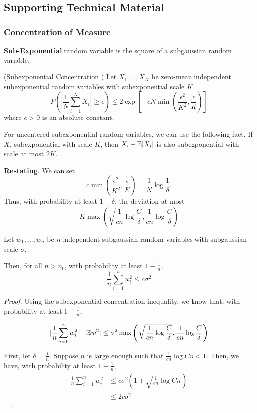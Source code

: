  
 
 
 
 
 
 \subsection{Supporting Technical Material}
 
 \subsubsection{Concentration of Measure}

\textbf{Sub-Exponential} random variable is the square of a subgaussian random variable\cite{vershynin2010introduction}.

\begin{proposition} (Subexponential Concentration \cite{vershynin2010introduction})
Let $X_1,...,X_N$ be zero-mean independent subexponential random variables with subexponential scale $K$. 
\[
P( | \frac{1}{N} \sum_{i=1}^N X_i | \geq \epsilon) \leq
	2 \exp \left[ -c N \min\left( \frac{\epsilon^2}{K^2}, \frac{\epsilon}{K} \right) \right]
\]
where $c > 0$ is an absolute constant.
\end{proposition}

For uncentered subexponential random variables, we can use the following fact. If $X_i$ subexponential with scale $K$, then $X_i - {\mathbb E}[X_i]$ is also subexponential with scale at most $2K$.

\textbf{Restating}. We can set
\[
c \min\left( \frac{\epsilon^2}{K^2}, \frac{\epsilon}{K} \right) = \frac{1}{N} \log \frac{1}{\delta}.
\]
Thus, with probability at least $1-\delta$, the deviation at most
\[
K \max\left( \sqrt{\frac{1}{cn} \log \frac{C}{\delta}},  \frac{1}{cn} \log \frac{C}{\delta} \right)
\]

\begin{corollary}
Let $w_1,...,w_n$ be $n$ independent subgaussian random variables with subgaussian scale $\sigma$. 

Then, for all $n > n_0$, with probability at least $1- \frac{1}{n}$,
\[
\frac{1}{n} \sum_{i=1}^n w_i^2 \leq c \sigma^2 
\]
\end{corollary}

\begin{proof}
Using the subexponential concentration inequality, we know that, with probability at least $1-\frac{1}{n}$, 

\[
| \frac{1}{n} \sum_{i=1}^n w_i^2 - {\mathbb E} w^2 | \leq \sigma^2 \max\left( \sqrt{\frac{1}{cn} \log \frac{C}{\delta}}, \frac{1}{cn}\log \frac{C}{\delta} \right)
\]

First, let $\delta = \frac{1}{n}$. Suppose $n$ is large enough such that $ \frac{1}{cn} \log Cn < 1$. Then, we have, with probability at least $1-\frac{1}{n}$,
\begin{align*}
 \frac{1}{n} \sum_{i=1}^n w_i^2 &\leq c\sigma^2 (1+\sqrt{\frac{1}{cn} \log Cn}) \\
		&\leq 2 c \sigma^2
 \end{align*}
 
\end{proof}

